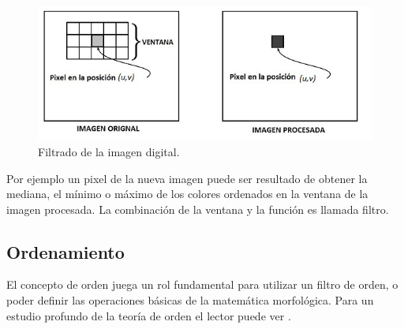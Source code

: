 \begin{figure}[htbp]
	\centering
		\includegraphics[scale=0.5]{fig/Filt.jpg}
	\caption{Filtrado de la imagen digital.}
	\label{fig:Filt}
\end{figure}



Por ejemplo un pixel de la nueva imagen puede ser resultado de obtener la mediana, el m\'inimo o m\'aximo de los colores ordenados en la ventana de la imagen procesada.  
La combinaci\'on de la ventana y la funci\'on es llamada filtro. 

\subsection{Ordenamiento}
El concepto de orden juega un rol fundamental para utilizar un filtro de orden, o poder definir las operaciones b\'asicas de la matem\'atica morfol\'ogica. Para un estudio profundo de la teor\'ia de orden el lector puede ver \cite{serra1993anamorphoses}.


  
